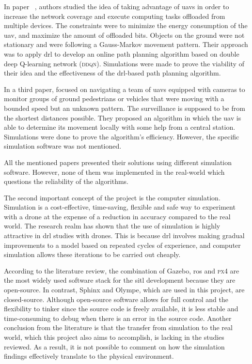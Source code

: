 \documentclass[../main.tex]{subfiles}
\begin{document}
	
	In paper ~\cite{pen21}, authors \citeauthor{pen21} studied the idea 
	of taking advantage of \glspl{uav} in order to increase the network
	coverage and execute computing tasks offloaded from multiple devices. 
	The constraints were to minimize the energy consumption of the \gls{uav}, 
	and maximize the amount of offloaded bits. 
	Objects on the ground were not stationary and were following a Gauss-Markov 
	movement pattern. Their approach was to apply \gls{drl} to develop an online path planning algorithm based on double deep Q-learning network (\textsc{ddqn}).
	Simulations were made to prove the viability of their idea and the 
	effectiveness of the \gls{drl}-based path planning algorithm.
	
	In a third paper, \citeauthor{hua21} focused on navigating a team
	of \glspl{uav} equipped with cameras to monitor groups of ground 
	pedestrians or vehicles that were moving with a bounded speed but an unknown pattern. 
	The surveillance is supposed to be from the shortest distances possible. 
	They proposed an algorithm in which the \gls{uav} is able to determine 
	its movement locally with some help from a central station.
	Simulations were done to prove the algorithm's efficiency. However, the 
	specific simulation software was not mentioned. 
	
	All the mentioned papers presented their solutions using different 
	simulation software. However, none of them was implemented in the real-world which questions the reliability of the algorithms.
	
	
	
	
	The second important concept of the project is the computer simulation.
	Simulation is a cost-effective, time-saving, flexible 
	and safe way to experiment with a drone
	at the expense of a reduction in accuracy compared to the real world.
	The research realm has shown that the use of simulation 
	is highly attractive in \gls{drl} studies with drones.
	This is because \gls{drl} involves
	making gradual improvements to a model based on 
	repeated cycles of experience, and computer simulation 
	allows these iterations to be carried out cheaply.
	
	According to the literature review, 
	the combination of Gazebo, \gls{ros}
	and \textsc{px4} are the most widely used software stack 
	for the \gls{sitl} development
	because they are open-source. 
	In contrast, Sphinx and Olympe, which are used in this project, 
	are closed-source.
	Although open-source software 
	allows for full control and the flexibility to tinker
	since the source code is freely available,
	it is less stable and time-consuming to debug
	when there is an error in the source code.
	Another conclusion from the literature is that 
	the transfer from simulation to the real world,
	which this project also aims to accomplish,
	is lacking in the studies reviewed.
	As a result, it is not possible to comment on 
	how the simulation findings effectively translate
	to the physical environment.
	
\end{document}

